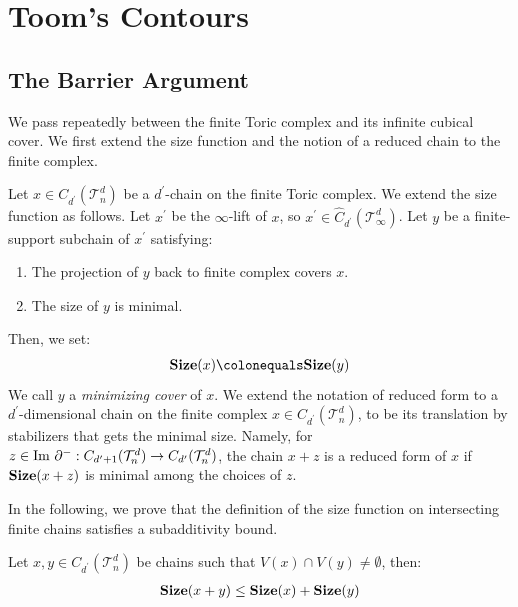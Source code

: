 \section{Toom's Contours}

\subsection{The Barrier Argument}
We pass repeatedly between the finite Toric complex and its infinite cubical cover. We first extend the size function and the notion of a reduced chain to the finite complex.  



\begin{definition}
  \label{def:mincover}
Let $x \in C_{d^{\prime}}(\mathcal{T}_n^d)$ be a $d^{\prime}$-chain on the finite Toric complex. We extend the size function as follows. Let $x^{\prime}$ be the $\infty$-lift of $x$, so $x^{\prime} \in \widehat C_{d^{\prime}}(\mathcal T_\infty^d)$. Let $y$ be a finite-support subchain of $x^{\prime}$ satisfying:
  \begin{enumerate}
    \item The projection of $y$ back to finite complex covers $x$.
    \item The size of $y$ is minimal. 
  \end{enumerate}
  Then, we set: 
  \begin{equation*}
    \begin{split}
      \Size{x} \colonequals \Size{y}
    \end{split}
  \end{equation*}
We call $y$ a \emph{minimizing cover} of $x$. We extend the notation of reduced form to a $d^{\prime}$-dimensional chain on the finite complex $x \in C_{d^{\prime}}(\mathcal{T}_n^d)$, to be its translation by stabilizers that gets the minimal size. Namely, for $z \in \text{Im } \partial^{-} : C_{d^{\prime}+1}(\mathcal{T}_n^d) \rightarrow C_{d^{\prime}}(\mathcal{T}_n^d)$, the chain $x+z$ is a reduced form of $x$ if $\mathbf{Size}(x+z)$ is minimal among the choices of $z$.
\end{definition}
In the following, we prove that the definition of the size function on intersecting finite chains satisfies a subadditivity bound.
\begin{claim}
  \label{clima:finitetrig}
  Let $x,y\in C_{d^{\prime}}(\mathcal{T}_n^d)$ be chains such that $V(x) \cap V(y) \neq \emptyset$, then: 
  \begin{equation*}
    \begin{split}
      \mathbf{Size}(x + y) \le \mathbf{Size}(x) + \mathbf{Size}(y)
    \end{split}
  \end{equation*}
\end{claim}
